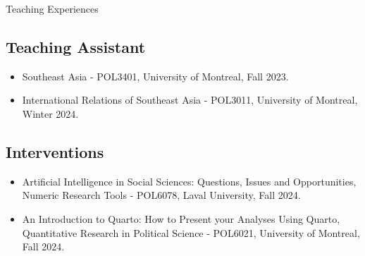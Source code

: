 \documentclass{resume} %
\begin{document}

\begin{rSection}{Teaching Experiences}
    \subsection*{Teaching Assistant}
        \begin{itemize}
            \item Southeast Asia - POL3401, University of Montreal, Fall 2023.
            \item International Relations of Southeast Asia - POL3011, University of Montreal, Winter 2024.
        \end{itemize}
    \subsection*{Interventions}
        \begin{itemize}
            \item Artificial Intelligence in Social Sciences: Questions, Issues and Opportunities, Numeric Research Tools - POL6078, Laval University, Fall 2024.
            \item An Introduction to Quarto: How to Present your Analyses Using Quarto, Quantitative Research in Political Science - POL6021, University of Montreal, Fall 2024.
        \end{itemize}
        
\end{rSection}

\end{document}
